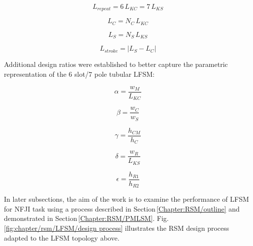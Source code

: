         
        \begin{equation}
            L_{repeat}=6\,L_{KC}=7\,L_{KS}
            \label{eq:chap/rsm/LFSM/L_repeat,LKC,LKS}
        \end{equation}
        
        \begin{equation}
            L_{C}=N_C\,L_{KC}
            \label{eq:chap/rsm/LFSM/L_C}
        \end{equation}
        
        \begin{equation}
            L_{S}=N_S\,L_{KS}
            \label{eq:chap/rsm/LFSM/L_S}
        \end{equation}
        
        
        \begin{equation}
            L_{stroke}= \big| L_S-L_C \big|
            \label{eq:chap/rsm/LFSM/L_stroke}
        \end{equation}
        
        
        Additional design ratios were established to better capture the parametric representation of the 6 slot/7 pole tubular \acs{LFSM}:
        
        
        \begin{equation}
            \alpha=\frac{w_M}{L_{KC}}
            \label{eq:chap/rsm/LFSM/alpha}
        \end{equation}
        
        
        \begin{equation}
            \beta=\frac{w_C}{w_S}
            \label{eq:chap/rsm/LFSM/beta}
        \end{equation}
        
        
        \begin{equation}
            \gamma=\frac{h_{CM}}{h_C}
            \label{eq:chap/rsm/LFSM/gamma}
        \end{equation}
        
        
        \begin{equation}
            \delta=\frac{w_R}{L_{KS}}
            \label{eq:chap/rsm/LFSM/delta}
        \end{equation}
        
        
        \begin{equation}
            \epsilon=\frac{h_{R1}}{h_{R2}}
            \label{eq:chap/rsm/LFSM/epsilon}
        \end{equation}

    
        In later subsections, the aim of the work is to examine the performance of \acs{LFSM} for \acs{NFJI} task using a process described in Section\,\ref{Chapter:RSM/outline} and demonstrated in Section\,\ref{Chapter:RSM/PMLSM}. Fig.\,\ref{fig:chapter/rsm/LFSM/design process} illustrates the \acs{RSM} design process adapted to the \acs{LFSM} topology above. 
    
